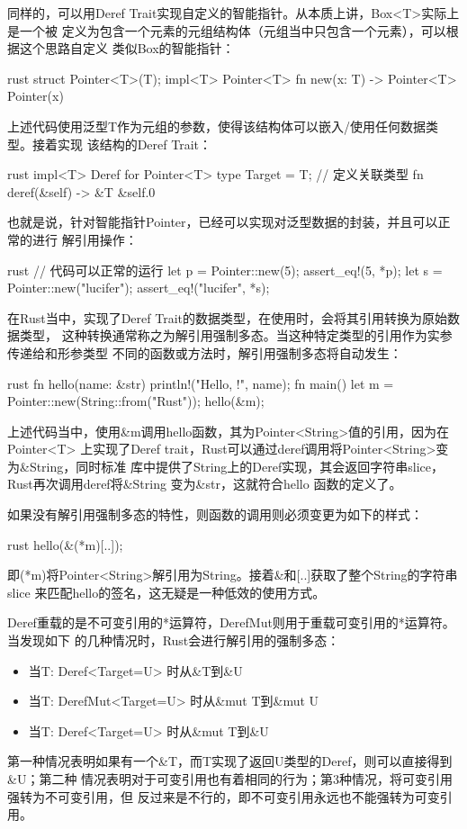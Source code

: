 同样的，可以用Deref Trait实现自定义的智能指针。从本质上讲，Box<T>实际上是一个被
定义为包含一个元素的元组结构体（元组当中只包含一个元素），可以根据这个思路自定义
类似Box的智能指针：
\begin{code-block}{rust}
struct Pointer<T>(T);
impl<T> Pointer<T> {
    fn new(x: T) -> Pointer<T> {
        Pointer(x)
    }
}
\end{code-block}
上述代码使用泛型T作为元组的参数，使得该结构体可以嵌入/使用任何数据类型。接着实现
该结构的Deref Trait：
\begin{code-block}{rust}
impl<T> Deref for Pointer<T> {
    type Target = T; // 定义关联类型
    fn deref(&self) -> &T {
        &self.0
    }
}
\end{code-block}
也就是说，针对智能指针Pointer，已经可以实现对泛型数据的封装，并且可以正常的进行
解引用操作：
\begin{code-block}{rust}
// 代码可以正常的运行
let p = Pointer::new(5);
assert_eq!(5, *p);
let s = Pointer::new("lucifer");
assert_eq!("lucifer", *s);
\end{code-block}

在Rust当中，实现了Deref Trait的数据类型，在使用时，会将其引用转换为原始数据类型，
这种转换通常称之为解引用强制多态。当这种特定类型的引用作为实参传递给和形参类型
不同的函数或方法时，解引用强制多态将自动发生：
\begin{code-block}{rust}
fn hello(name: &str) {
    println!("Hello, {}!", name);
}
fn main() {
    let m = Pointer::new(String::from("Rust"));
    hello(&m);
}
\end{code-block}
上述代码当中，使用\&m调用hello函数，其为Pointer<String>值的引用，因为在Pointer<T>
上实现了Deref trait，Rust可以通过deref调用将Pointer<String>变为\&String，同时标准
库中提供了String上的Deref实现，其会返回字符串slice，Rust再次调用deref将\&String
变为\&str，这就符合hello 函数的定义了。

如果没有解引用强制多态的特性，则函数的调用则必须变更为如下的样式：
\begin{code-block}{rust}
hello(&(*m)[..]);
\end{code-block}
即(*m)将Pointer<String>解引用为String。接着\&和[..]获取了整个String的字符串slice
来匹配hello的签名，这无疑是一种低效的使用方式。

Deref重载的是不可变引用的*运算符，DerefMut则用于重载可变引用的*运算符。当发现如下
的几种情况时，Rust会进行解引用的强制多态：
\begin{itemize}
  \item 当T: Deref<Target=U> 时从\&T到\&U
  \item 当T: DerefMut<Target=U> 时从\&mut T到\&mut U
  \item 当T: Deref<Target=U> 时从\&mut T到\&U
\end{itemize}
第一种情况表明如果有一个\&T，而T实现了返回U类型的Deref，则可以直接得到\&U；第二种
情况表明对于可变引用也有着相同的行为；第3种情况，将可变引用强转为不可变引用，但
反过来是不行的，即不可变引用永远也不能强转为可变引用。

